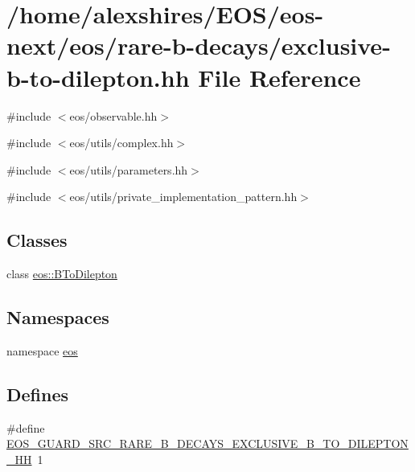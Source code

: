 \hypertarget{exclusive-b-to-dilepton_8hh}{
\section{/home/alexshires/EOS/eos-\/next/eos/rare-\/b-\/decays/exclusive-\/b-\/to-\/dilepton.hh File Reference}
\label{exclusive-b-to-dilepton_8hh}
}
{\ttfamily \#include $<$eos/observable.hh$>$}\par
{\ttfamily \#include $<$eos/utils/complex.hh$>$}\par
{\ttfamily \#include $<$eos/utils/parameters.hh$>$}\par
{\ttfamily \#include $<$eos/utils/private\_\-implementation\_\-pattern.hh$>$}\par
\subsection*{Classes}
\begin{DoxyCompactItemize}
\item 
class \hyperlink{classeos_1_1BToDilepton}{eos::BToDilepton}
\end{DoxyCompactItemize}
\subsection*{Namespaces}
\begin{DoxyCompactItemize}
\item 
namespace \hyperlink{namespaceeos}{eos}
\end{DoxyCompactItemize}
\subsection*{Defines}
\begin{DoxyCompactItemize}
\item 
\#define \hyperlink{exclusive-b-to-dilepton_8hh_aa7e7168345c14d0330e9c96cd34ea342}{EOS\_\-GUARD\_\-SRC\_\-RARE\_\-B\_\-DECAYS\_\-EXCLUSIVE\_\-B\_\-TO\_\-DILEPTON\_\-HH}~1
\end{DoxyCompactItemize}


